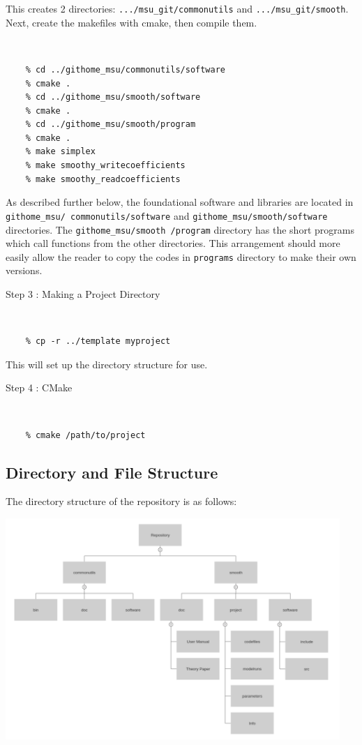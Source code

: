 \documentclass[12pt]{article}
\numberwithin{equation}{section}
\numberwithin{figure}{section}
\begin{document}
This creates 2 directories: {\tt .../msu\_git/commonutils} and {\tt .../msu\_git/smooth}. Next, create the makefiles with cmake, then compile them.\\
\vspace{-20pt}
{\tt 
\begin{verbatim}
    % cd ../githome_msu/commonutils/software
    % cmake .
    % cd ../githome_msu/smooth/software
    % cmake .
    % cd ../githome_msu/smooth/program
    % cmake .
    % make simplex
    % make smoothy_writecoefficients
    % make smoothy_readcoefficients
\end{verbatim}
}
As described further below, the foundational software and libraries are located in {\tt githome\_msu/ commonutils/software} and {\tt githome\_msu/smooth/software} directories. The {\tt githome\_msu/smooth /program} directory has the short programs which call functions from the other directories. This arrangement should more easily allow the reader to copy the codes in {\tt programs} directory to make their own versions.

\begin{description}
\item[Step 3 : Making a Project Directory] 
\end{description}
{\tt 
\begin{verbatim}
    % cp -r ../template myproject
\end{verbatim}
}
     
This will set up the directory structure for use.  \\ 

\begin{description}
\item[Step 4 : CMake]
\end{description}
\vspace{-20pt}
{\tt 
\begin{verbatim}
    % cmake /path/to/project
\end{verbatim}
}

\subsection{Directory and File Structure}

The directory structure of the repository is as follows: 

\centerline{\includegraphics[width = 0.95\textwidth]{Structure_Tree.png}}
\end{document}
